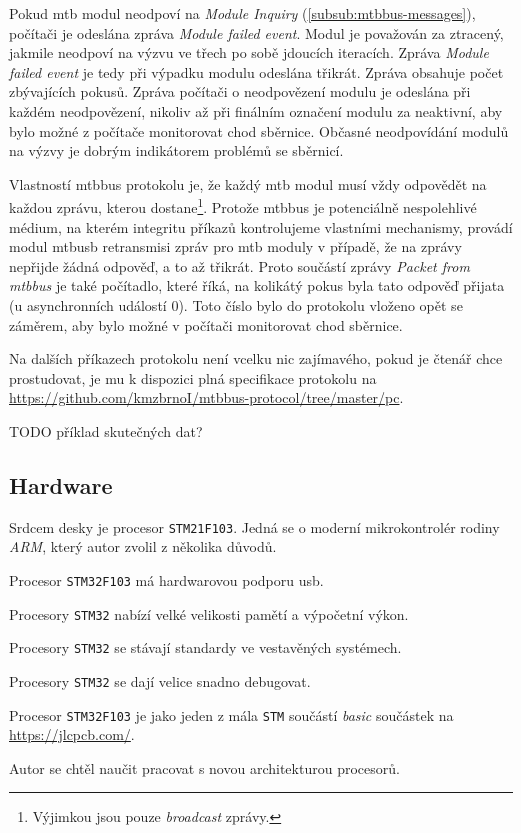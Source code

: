 Pokud \gls{mtb} modul neodpoví na \textit{Module Inquiry}
(\ref{subsub:mtbbus-messages}), počítači je odeslána zpráva \textit{Module
failed event}. Modul je považován za ztracený, jakmile neodpoví na výzvu
ve třech po sobě jdoucích iteracích. Zpráva \textit{Module failed event}
je tedy při výpadku modulu odeslána třikrát. Zpráva obsahuje počet zbývajících
pokusů. Zpráva počítači o neodpovězení modulu je odeslána při každém neodpovězení,
nikoliv až při finálním označení modulu za neaktivní, aby bylo možné z počítače
monitorovat chod sběrnice. Občasné neodpovídání modulů na výzvy je dobrým
indikátorem problémů se sběrnicí.

Vlastností \gls{mtbbus} protokolu je, že každý \gls{mtb} modul musí vždy
odpovědět na každou zprávu, kterou dostane\footnote{Výjimkou jsou pouze
\textit{broadcast} zprávy.}. Protože \gls{mtbbus} je potenciálně nespolehlivé
médium, na kterém integritu příkazů kontrolujeme vlastními mechanismy, provádí
modul \gls{mtbusb} retransmisi zpráv pro \gls{mtb} moduly v případě, že na zprávy
nepřijde žádná odpověď, a to až třikrát. Proto součástí zprávy \textit{Packet
from \gls{mtbbus}} je také počítadlo, které říká, na kolikátý pokus byla tato
odpověď přijata (u asynchronních událostí 0). Toto číslo bylo do protokolu
vloženo opět se záměrem, aby bylo možné v počítači monitorovat chod sběrnice.

Na dalších příkazech protokolu není vcelku nic zajímavého, pokud je čtenář chce
prostudovat, je mu k dispozici plná specifikace protokolu na
\url{https://github.com/kmzbrnoI/mtbbus-protocol/tree/master/pc}.

TODO příklad skutečných dat?

\subsection{Hardware}

Srdcem desky je procesor \texttt{STM21F103}. Jedná se o moderní mikrokontrolér
rodiny \textit{ARM}, který autor zvolil z několika důvodů.

\begin{compactenum}
\item Procesor \texttt{STM32F103} má hardwarovou podporu \gls{usb}.
\item Procesory \texttt{STM32} nabízí velké velikosti pamětí a výpočetní výkon.
\item Procesory \texttt{STM32} se stávají standardy ve vestavěných systémech.
\item Procesory \texttt{STM32} se dají velice snadno debugovat.
\item Procesor \texttt{STM32F103} je jako jeden z mála \texttt{STM} součástí
	\textit{basic} součástek na \url{https://jlcpcb.com/}.
\item Autor se chtěl naučit pracovat s novou architekturou procesorů.
\end{compactenum}

